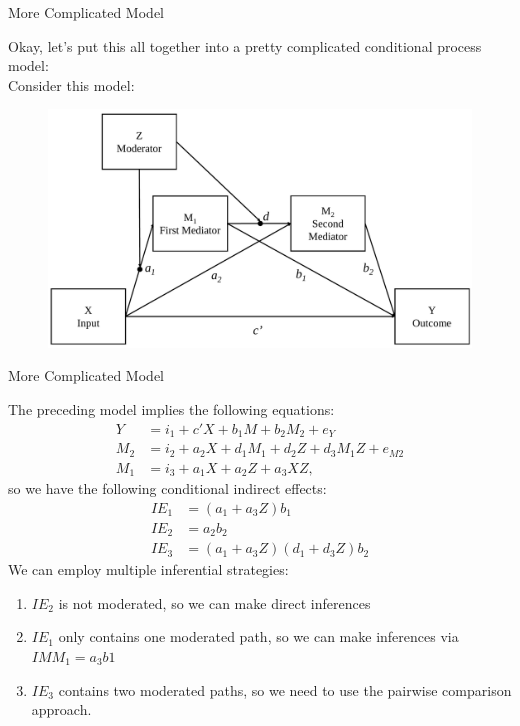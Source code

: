 \documentclass{beamer}
\newcommand{\va}[0]{\vspace{12pt}}
\begin{document}
\begin{frame}{More Complicated Model}
  
  Okay, let's put this all together into a pretty complicated
  conditional process model:\\ 
  \va 
  Consider this model:
  \begin{figure}
    \includegraphics[width = \textwidth]{figures/serialMediatorModA1DwithZConceptual.pdf}
  \end{figure}
  
\end{frame}



\begin{frame}{More Complicated Model}
  
  The preceding model implies the following equations:
  \begin{align}
    Y &= i_1 + c'X + b_1M + b_2M_2 + e_{Y}\\
    M_2 &= i_2 + a_2X + d_1M_1 + d_2Z + d_3M_1Z + e_{M2}\\
    M_1 &= i_3 + a_1X + a_2Z + a_3XZ,
  \end{align}
  so we have the following conditional indirect effects:
  \begin{align*}
    IE_1 &= \left(a_1 + a_3Z\right) b_1\\
    IE_2 &= a_2b_2\\
    IE_3 &= \left(a_1 + a_3Z\right) \left(d_1 + d_3Z\right) b_2
  \end{align*}
  We can employ multiple inferential strategies:
  \begin{enumerate}
    \item $IE_2$ is not moderated, so we can make direct inferences
    \item $IE_1$ only contains one moderated path, so we can make
      inferences via $IMM_1 = a_3b1$
    \item $IE_3$ contains two moderated paths, so we need to use the
      pairwise comparison approach.
  \end{enumerate}
  
\end{frame}
\end{document}
